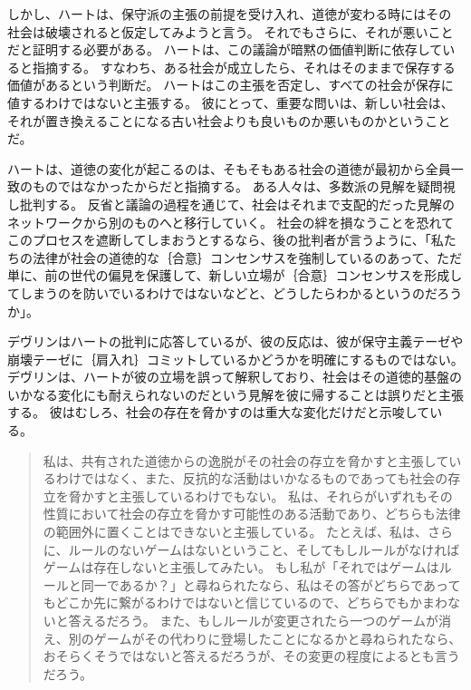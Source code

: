 \documentclass[paper=a4,book,openany]{jlreq}
\newcommand{\ig}[1]{}           %
\begin{document}
しかし、ハートは、保守派の主張の前提を受け入れ、道徳が変わる時にはその社会は破壊されると仮定してみようと言う。
それでもさらに、それが悪いことだと証明する必要がある。
ハートは、この議論が暗黙の価値判断に依存していると指摘する。
すなわち、ある社会が成立したら、それはそのままで保存する価値があるという判断だ。
ハートはこの主張を否定し、すべての社会が保存に値するわけではないと主張する。
彼にとって、重要な問いは、新しい社会は、それが置き換えることになる古い社会よりも良いものか悪いものかということだ。

ハートは、道徳の変化が起こるのは、そもそもある社会の道徳が最初から全員一致のものではなかったからだと指摘する。
ある人々は、多数派の見解を疑問視し批判する。
反省と議論の過程を通じて、社会はそれまで支配的だった見解のネットワークから別のものへと移行していく。
社会の絆を損なうことを恐れてこのプロセスを遮断してしまおうとするなら、後の批判者が言うように、「私たちの法律が社会の道徳的な｛合意｝{コンセンサス}を強制しているのあって、ただ単に、前の世代の偏見を保護して、新しい立場が｛合意｝{コンセンサス}を形成してしまうのを防いでいるわけではないなどと、どうしたらわかるというのだろうか」\citep[p.169]{bix00:_juris}。

デヴリン\ig{Patrick Devlin}はハートの批判に応答しているが、彼の反応は、彼が保守主義テーゼや崩壊テーゼに｛肩入れ｝{コミット}しているかどうかを明確にするものではない。
デヴリン\ig{Patrick Devlin}は、ハートが彼の立場を誤って解釈しており、社会はその道徳的基盤のいかなる変化にも耐えられないのだという見解を彼に帰することは誤りだと主張する。
彼はむしろ、社会の存在を脅かすのは重大な変化だけだと示唆している。

\begin{quote}
私は、共有された道徳からの逸脱がその社会の存立を脅かすと主張しているわけではなく、また、反抗的な活動はいかなるものであっても社会の存立を脅かすと主張しているわけでもない。
私は、それらがいずれもその性質において社会の存立を脅かす可能性のある活動であり、どちらも法律の範囲外に置くことはできないと主張している。
たとえば、私は、さらに、ルールのないゲームはないということ、そしてもしルールがなければゲームは存在しないと主張してみたい。
もし私が「それではゲームはルールと同一であるか？」と尋ねられたなら、私はその答がどちらであってもどこか先に繋がるわけではないと信じているので、どちらでもかまわないと答えるだろう。
また、もしルールが変更されたら一つのゲームが消え、別のゲームがその代わりに登場したことになるかと尋ねられたなら、おそらくそうではないと答えるだろうが、その変更の程度によるとも言うだろう。
\citep[p.37]{devlin65:_enfor_moral}
 \end{quote}
\end{document}
